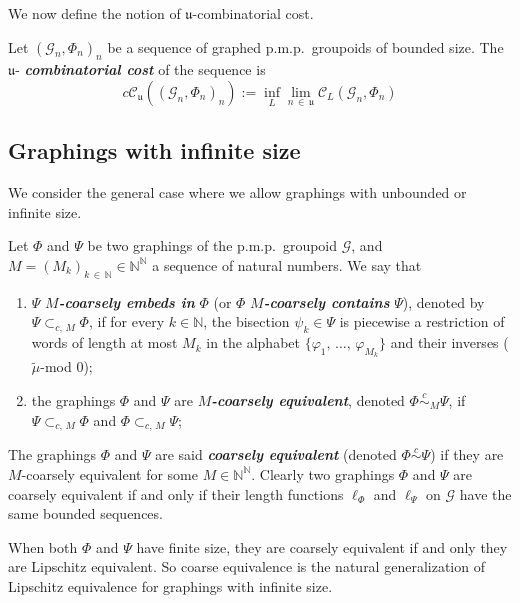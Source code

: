 \documentclass[AHL,Unicode,longabstracts,published]{cedram}
\newcommand{\defin}[1]{\textbf{\emph{#1}}}
\newcommand{\Nmath}{\mathbb{N}}
\newcommand{\cost}{\mathcal{C}}
\newcommand{\ccost}{c\mathcal{C}}
\newcommand{\cg}{\mathcal{G}}
\newcommand{\ul}{\mathfrak{u}}
\newcommand{\ph}{\varphi}
\newcommand{\pmp}{p.m.p.\ }
\newcommand\ceq{\overset{c}{\sim}}
\begin{document}
\medskip
We now define the notion of $\ul$-combinatorial cost.
\begin{defi}\label{def: ul-comb-cost}
Let $(\cg_n,\Phi_n)_n$ be a sequence of graphed \pmp groupoids of bounded size. The $\ul$-
\defin{combinatorial cost} of the sequence is
\begin{equation}
\ccost_\ul\left(\left(\cg_n,\Phi_n\right)_n\right):=\inf_L\lim_{n\,\in\,\ul}\cost_L\left(\cg_n,\Phi_n\right)
\end{equation}
\end{defi}

\subsection{Graphings with infinite size}\label{subsection:infinite_graphings}
We consider the general case where we allow graphings with unbounded or infinite size.

\begin{defi}\label{def:Coarsely-contain-equiv-graphins}
Let $\Phi$ and $\Psi$ be two graphings of the \pmp groupoid $\cg$, and $M=(M_k)_{k\,\in\,\Nmath} \in \Nmath^\Nmath$ a sequence of natural numbers. We say that
\begin{enumerate}
\item \label{defi3.8.1}$\Psi$ \defin{$M$-coarsely embeds in} $\Phi$ (or $\Phi$ \defin{$M$-coarsely contains} $\Psi$), denoted by $\Psi\subset_{c,\,M} \Phi$, if for every $k\in\Nmath$, the bisection $\psi_k\in\Psi$ is piecewise a restriction of words of length at most $M_k$ in the alphabet $\{\ph_1,\,\ldots,\,\ph_{M_k}\}$ and their inverses ($\widetilde{\mu}$-mod $0$);
\item \label{defi3.8.2}the graphings $\Phi$ and $\Psi$ are \defin{$M$-coarsely equivalent}, denoted $\Phi\ceq_M\Psi$, if $\Psi\subset_{c,\,M} \Phi$ and $\Phi \subset_{c,\,M} \Psi$;
\end{enumerate}
\end{defi}

The graphings $\Phi$ and $\Psi$ are said
\defin{coarsely equivalent} (denoted $\Phi\ceq\Psi$) if they are $M$-coarsely equivalent for some $M \in \Nmath^\Nmath$. Clearly two graphings $\Phi$ and $\Psi$ are coarsely equivalent if and only if their length functions $\ell_\Phi$ and $\ell_\Psi$ on $\cg$ have the same bounded sequences.

When both $\Phi$ and $\Psi$ have finite size, they are coarsely equivalent if and only they are Lipschitz equivalent. So coarse equivalence is the natural generalization of Lipschitz equivalence for graphings with infinite size.
\end{document}
